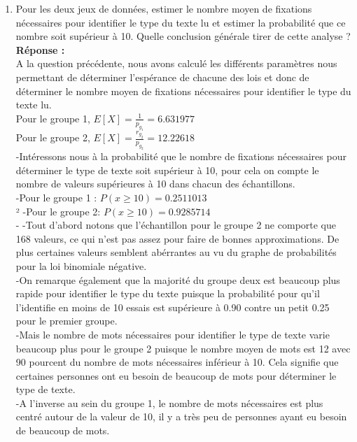 \documentclass[12pt]{article}
\begin{document}
\begin{enumerate}
\item Pour les deux jeux de données, estimer le nombre moyen de fixations nécessaires pour identifier le type du texte lu et estimer la probabilité que ce nombre soit supérieur à 10. Quelle conclusion générale tirer de cette analyse ? \\
\textbf{Réponse :\\}
A la question précédente, nous avons calculé les différents paramètres nous permettant de déterminer l'espérance de chacune des lois et donc de déterminer le nombre moyen de fixations nécessaires pour identifier le type du texte lu. \\

 Pour le groupe 1, $E[X] = \frac{1}{p_{g_{1}}} = 6.631977 $ \\
Pour le groupe 2, $E[X] = \frac{r_{g_{2}}}{p_{g_{2}}} = 12.22618 $ \\

-Intéressons nous à la probabilité que le nombre de fixations nécessaires pour déterminer le type de texte soit supérieur à 10, pour cela on compte le nombre de valeurs supérieures à 10 dans chacun des échantillons. \\
 -Pour le groupe 1 : $P(x \geq 10) = 0.2511013 $ \\²
 -Pour le groupe 2: $P(x \geq 10) = 0.9285714$\\
 -
 -Tout d'abord notons que l'échantillon pour le groupe 2 ne comporte que 168 valeurs, ce qui n'est pas assez pour faire de bonnes approximations. De plus certaines valeurs semblent abérrantes au vu du graphe de probabilités pour la loi binomiale négative. \\
 -On remarque également que la majorité du  groupe deux est beaucoup plus rapide pour identifier le type du texte puisque la probabilité pour qu'il l'identifie en moins de 10 essais est supérieure à 0.90 contre un petit 0.25 pour le premier groupe.\\
 -Mais le nombre de mots nécessaires pour identifier le type de texte varie beaucoup plus pour le groupe 2 puisque le nombre moyen de mots est 12 avec 90 pourcent du nombre de mots nécessaires inférieur à 10. Cela signifie que certaines personnes ont eu besoin de beaucoup de mots pour déterminer le type de texte.\\
 -A l'inverse au sein du groupe 1, le nombre de mots nécessaires est plus centré autour de la valeur de 10, il y a très peu de personnes ayant eu besoin de beaucoup de mots.

\end{enumerate}
\end{document}
